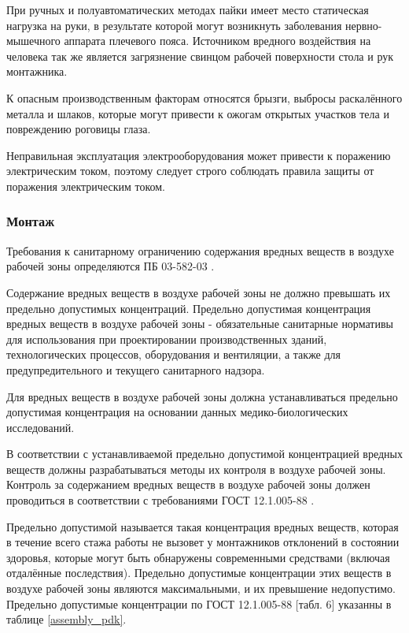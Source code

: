 При ручных и полуавтоматических методах пайки имеет место статическая нагрузка на
руки, в результате которой могут возникнуть заболевания нервно-мышечного аппарата
плечевого пояса. Источником вредного воздействия на человека так же является
загрязнение свинцом рабочей поверхности стола и рук монтажника.

К опасным производственным факторам относятся брызги, выбросы раскалённого
металла и шлаков, которые могут привести к ожогам открытых участков тела и
повреждению роговицы глаза.

Неправильная эксплуатация электрооборудования может привести к поражению
электрическим током, поэтому следует строго соблюдать правила защиты от поражения
электрическим током.

\subsubsection{Монтаж}

Требования к санитарному ограничению содержания вредных веществ в воздухе рабочей
зоны определяются ПБ 03-582-03 \cite{ecology_pb_03_582_03}.

Содержание вредных веществ в воздухе рабочей зоны не должно превышать их
предельно допустимых концентраций. Предельно допустимая концентрация вредных
веществ в воздухе рабочей зоны - обязательные санитарные нормативы для
использования при проектировании производственных зданий, технологических
процессов, оборудования и вентиляции, а также для предупредительного и
текущего санитарного надзора.

Для вредных веществ в воздухе рабочей зоны должна устанавливаться предельно
допустимая концентрация на основании данных медико-биологических исследований.

В соответствии с устанавливаемой предельно допустимой концентрацией вредных
веществ должны разрабатываться методы их контроля в воздухе рабочей зоны.
Контроль за содержанием вредных веществ в воздухе рабочей зоны должен проводиться
в соответствии с требованиями ГОСТ 12.1.005-88 \cite{ecology_gost_005_88}.

Предельно допустимой называется такая концентрация вредных веществ, которая в
течение всего стажа работы не вызовет у монтажников отклонений в состоянии
здоровья, которые могут быть обнаружены современными средствами (включая
отдалённые последствия). Предельно допустимые концентрации этих веществ в воздухе
рабочей зоны являются максимальными, и их превышение недопустимо. Предельно
допустимые концентрации по ГОСТ 12.1.005-88 \cite{ecology_gost_005_88}[табл. 6]
указанны в таблице \ref{assembly_pdk}.

